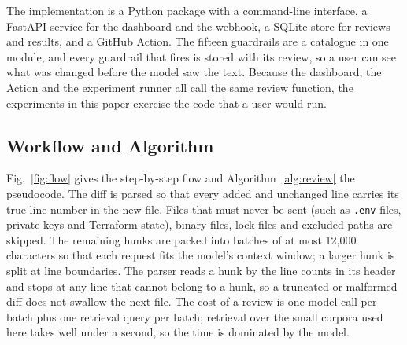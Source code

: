 \documentclass[12pt,onecolumn,draftclsnofoot]{IEEEtran}
\begin{document}
The implementation is a Python package with a command-line interface, a FastAPI service for the dashboard and the webhook, a SQLite store for reviews and results, and a GitHub Action. The fifteen guardrails are a catalogue in one module, and every guardrail that fires is stored with its review, so a user can see what was changed before the model saw the text. Because the dashboard, the Action and the experiment runner all call the same review function, the experiments in this paper exercise the code that a user would run.

\subsection{Workflow and Algorithm}
Fig.~\ref{fig:flow} gives the step-by-step flow and Algorithm~\ref{alg:review} the pseudocode. The diff is parsed so that every added and unchanged line carries its true line number in the new file. Files that must never be sent (such as \texttt{.env} files, private keys and Terraform state), binary files, lock files and excluded paths are skipped. The remaining hunks are packed into batches of at most 12,000 characters so that each request fits the model's context window; a larger hunk is split at line boundaries. The parser reads a hunk by the line counts in its header and stops at any line that cannot belong to a hunk, so a truncated or malformed diff does not swallow the next file. The cost of a review is one model call per batch plus one retrieval query per batch; retrieval over the small corpora used here takes well under a second, so the time is dominated by the model.
\end{document}
